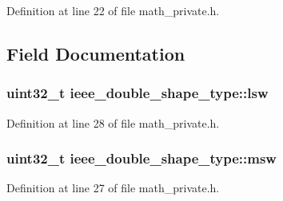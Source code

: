 Definition at line 22 of file math\-\_\-private.\-h.



\subsection{Field Documentation}
\hypertarget{unionieee__double__shape__type_a31323ff275e4b9f21d1f0dac6ed02a97}{
\subsubsection[{lsw}]{\setlength{\rightskip}{0pt plus 5cm}uint32\-\_\-t ieee\-\_\-double\-\_\-shape\-\_\-type\-::lsw}}\label{unionieee__double__shape__type_a31323ff275e4b9f21d1f0dac6ed02a97}


Definition at line 28 of file math\-\_\-private.\-h.

\hypertarget{unionieee__double__shape__type_a887ac49e741cafa9c74aa397a6fa04a5}{
\subsubsection[{msw}]{\setlength{\rightskip}{0pt plus 5cm}uint32\-\_\-t ieee\-\_\-double\-\_\-shape\-\_\-type\-::msw}}\label{unionieee__double__shape__type_a887ac49e741cafa9c74aa397a6fa04a5}


Definition at line 27 of file math\-\_\-private.\-h.

